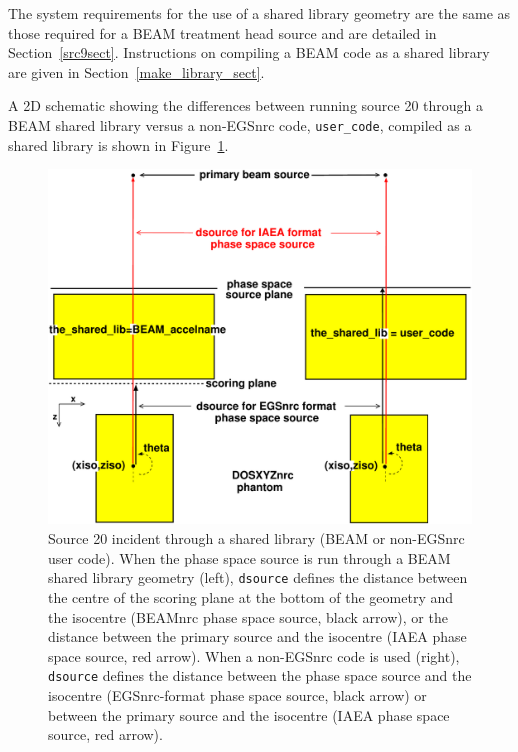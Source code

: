\documentclass[12pt,twoside]{article}      %
\begin{document}
The system requirements for the use of a shared library geometry are the same as those required for
a BEAM treatment head source and are detailed in Section~\ref{src9sect}.  Instructions on compiling
a BEAM code as a shared library are given in Section~\ref{make_library_sect}.

A 2D schematic showing the differences between running source 20 through a BEAM shared library versus a
non-EGSnrc code, {\tt user\_code}, compiled as a shared library is shown in Figure~\ref{fig_src20_1}.

\begin{figure}[htbp]
\begin{center}
\hspace*{-1cm}\includegraphics[width=17cm]{figures/src20_1}
\caption{Source 20 incident through a shared library (BEAM or non-EGSnrc user code).  When
the phase space source is run through a BEAM shared library geometry (left), {\tt dsource} defines
the distance between the centre of the scoring plane at the bottom of the geometry and the isocentre (BEAMnrc
phase space source, black arrow), or the distance between the primary source and the isocentre (IAEA phase
space source, red arrow).
When a non-EGSnrc code is used (right), {\tt dsource} defines the distance between the phase space source
and the isocentre (EGSnrc-format phase space source, black arrow) or between the primary source and the isocentre (IAEA phase space
source, red arrow).}
\label{fig_src20_1}
\end{center}
\end{figure}
\end{document}
